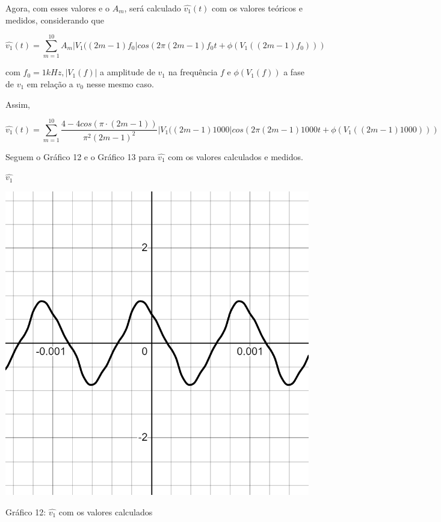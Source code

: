 Agora, com esses valores e o $A_m$, será calculado $\hat{v_1}(t)$ com os valores teóricos e medidos, considerando que 

\[\hat{v_1}(t)=\sum\limits_{m=1}^{10}A_m|V_1((2m-1)f_0|cos(2\pi(2m-1)f_0t+\phi(V_1((2m-1)f_0)))\]

com $f_0=1kHz, |V_1(f)|$ a amplitude de $v_1$ na frequência $f$ e $\phi(V_1(f))$ a fase de $v_1$ em relação a $v_0$ nesse mesmo caso.

Assim, 

\[\hat{v_1}(t)=\sum\limits_{m=1}^{10} \frac{4-4cos(\pi\cdot(2m-1))}{\pi^2(2m-1)^2} |V_1((2m-1)1000|cos(2\pi(2m-1)1000t+\phi(V_1((2m-1)1000)))\]

Seguem o Gráfico 12 e o Gráfico 13 para $\hat{v_1}$ com os valores calculados e medidos.

\begin{center}$\hat{v_1}$\end{center}
\begin{table}[h]
\centering
\includegraphics[scale=0.4]{figuras/v1-valores_calculados}
\end{table}\vspace{-6cm}\vspace{6cm}
\begin{center}
Gráfico 12: $\hat{v_1}$ com os valores calculados
\end{center}

